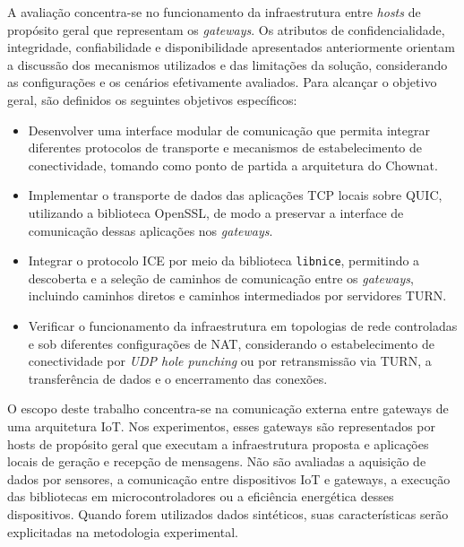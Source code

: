 A avaliação concentra-se no funcionamento da infraestrutura entre \textit{hosts} de propósito geral que representam os \textit{gateways}. Os atributos de confidencialidade, integridade, confiabilidade e disponibilidade apresentados anteriormente orientam a discussão dos mecanismos utilizados e das limitações da solução, considerando as configurações e os cenários efetivamente avaliados. Para alcançar o objetivo geral, são definidos os seguintes objetivos específicos:

\begin{itemize}

\item Desenvolver uma interface modular de comunicação que permita integrar diferentes protocolos de transporte e mecanismos de estabelecimento de conectividade, tomando como ponto de partida a arquitetura do Chownat.

\item Implementar o transporte de dados das aplicações TCP locais sobre QUIC, utilizando a biblioteca OpenSSL, de modo a preservar a interface de comunicação dessas aplicações nos \textit{gateways}.

\item Integrar o protocolo ICE por meio da biblioteca \texttt{libnice}, permitindo a descoberta e a seleção de caminhos de comunicação entre os \textit{gateways}, incluindo caminhos diretos e caminhos intermediados por servidores TURN.

\item Verificar o funcionamento da infraestrutura em topologias de rede controladas e sob diferentes configurações de NAT, considerando o estabelecimento de conectividade por \textit{UDP hole punching} ou por retransmissão via TURN, a transferência de dados e o encerramento das conexões.

\end{itemize}

O escopo deste trabalho concentra-se na comunicação externa entre gateways de uma arquitetura IoT. Nos experimentos, esses gateways são representados por hosts de propósito geral que executam a infraestrutura proposta e aplicações locais de geração e recepção de mensagens. Não são avaliadas a aquisição de dados por sensores, a comunicação entre dispositivos IoT e gateways, a execução das bibliotecas em microcontroladores ou a eficiência energética desses dispositivos. Quando forem utilizados dados sintéticos, suas características serão explicitadas na metodologia experimental.

